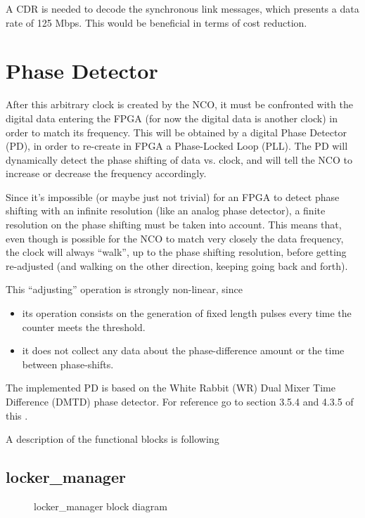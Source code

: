 \documentclass[letterpaper,10pt,english,openany,oneside]{sphinxmanual}
\begin{document}
A CDR is needed to decode the synchronous link messages, which presents a data rate of 125 Mbps. This would be beneficial in terms of cost reduction.


\chapter{Phase Detector}
\label{\detokenize{code_explanation/phase_detector:phase-detector}}\label{\detokenize{code_explanation/phase_detector::doc}}
After this arbitrary clock is created by the NCO, it must be confronted with the digital data entering the FPGA (for now the digital data is another clock) in order to match its frequency. This will be obtained by a digital Phase Detector (PD), in order to re-create in FPGA a Phase-Locked Loop (PLL). The PD will dynamically detect the phase shifting of data vs. clock, and will tell the NCO to increase or decrease the frequency accordingly.

Since it’s impossible (or maybe just not trivial) for an FPGA to detect phase shifting with an infinite resolution (like an analog phase detector), a finite resolution on the phase shifting must be taken into account. This means that, even though is possible for the NCO to match very closely the data frequency, the clock will always “walk”, up to the phase shifting resolution, before getting re-adjusted (and walking on the other direction, keeping going back and forth).

This “adjusting” operation is strongly non-linear, since
\begin{itemize}
\item {} 
its operation consists on the generation of fixed length pulses every time the counter meets the threshold.

\item {} 
it does not collect any data about the phase-difference amount or the time between phase-shifts.

\end{itemize}

The implemented PD is based on the White Rabbit (WR) Dual Mixer Time Difference (DMTD) phase detector.
For reference go to section 3.5.4 and 4.3.5 of this .

A description of the functional blocks is following


\section{locker\_manager}
\label{\detokenize{code_explanation/phase_detector:locker-manager}}\label{\detokenize{code_explanation/phase_detector:locker-manager-ref}}
\begin{figure}[htbp]
\centering
\capstart

\noindent{}
\caption{locker\_manager block diagram}\label{\detokenize{code_explanation/phase_detector:id2}}\end{figure}
\end{document}
